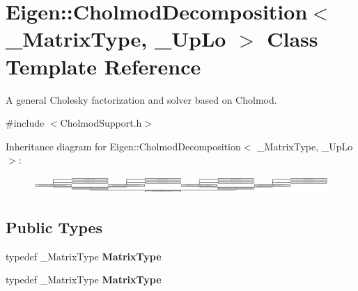 \hypertarget{class_eigen_1_1_cholmod_decomposition}{}\section{Eigen\+:\+:Cholmod\+Decomposition$<$ \+\_\+\+Matrix\+Type, \+\_\+\+Up\+Lo $>$ Class Template Reference}
\label{class_eigen_1_1_cholmod_decomposition}


A general Cholesky factorization and solver based on Cholmod.  




{\ttfamily \#include $<$Cholmod\+Support.\+h$>$}

Inheritance diagram for Eigen\+:\+:Cholmod\+Decomposition$<$ \+\_\+\+Matrix\+Type, \+\_\+\+Up\+Lo $>$\+:\begin{figure}[H]
\begin{center}
\leavevmode
\includegraphics[height=0.632911cm]{class_eigen_1_1_cholmod_decomposition}
\end{center}
\end{figure}
\subsection*{Public Types}
\begin{DoxyCompactItemize}
\item 
\mbox{\label{class_eigen_1_1_cholmod_decomposition_aea53309ad25a4d695c6884ca4016ab89}} 
typedef \+\_\+\+Matrix\+Type {\bfseries Matrix\+Type}
\item 
\mbox{\label{class_eigen_1_1_cholmod_decomposition_aea53309ad25a4d695c6884ca4016ab89}} 
typedef \+\_\+\+Matrix\+Type {\bfseries Matrix\+Type}
\end{DoxyCompactItemize}
